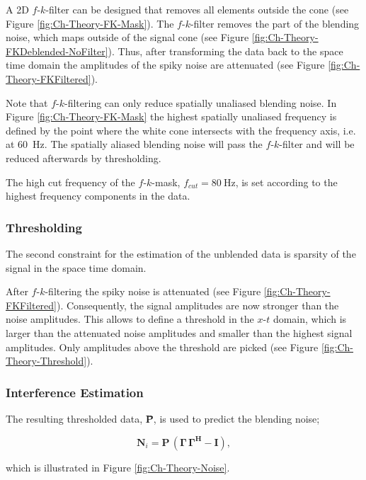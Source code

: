 A 2D $f$-$k$-filter can be designed that removes all elements outside the cone (see Figure \ref{fig:Ch-Theory-FK-Mask}). The $f$-$k$-filter removes the part of the blending noise, which maps outside of the signal cone (see Figure \ref{fig:Ch-Theory-FKDeblended-NoFilter}). Thus, after transforming the data back to the space time domain the amplitudes of the spiky noise are attenuated (see Figure \ref{fig:Ch-Theory-FKFiltered}). 

Note that $f$-$k$-filtering can only reduce spatially unaliased blending noise. In Figure \ref{fig:Ch-Theory-FK-Mask} the highest spatially unaliased frequency is defined by the point where the white cone intersects with the frequency axis, i.e. at \SI{60}{\hertz}. The spatially aliased blending noise will pass the $f$-$k$-filter and will be reduced afterwards by thresholding. 

The high cut frequency of the $f$-$k$-mask, $f_{cut} = \SI{80}{\hertz}$, is set according to the highest frequency components in the data. 

\subsubsection*{Thresholding}

The second constraint for the estimation of the unblended data is sparsity of the signal in the space time domain.

After $f$-$k$-filtering the spiky noise is attenuated (see Figure \ref{fig:Ch-Theory-FKFiltered}). Consequently, the signal amplitudes are now stronger than the noise amplitudes. This allows to define a threshold in the $x$-$t$ domain, which is larger than the attenuated noise amplitudes and smaller than the highest signal amplitudes. Only amplitudes above the threshold are picked (see Figure \ref{fig:Ch-Theory-Threshold}). 

\subsubsection*{Interference Estimation}

The resulting thresholded data, \textbf{\={P}}, is used to predict the blending noise;

\begin{equation}
	\textbf{\^{N}}_{i} = \textbf{\={P}} \, (\mathbf{\Gamma \, \Gamma^H} - \textbf{I}),
	\label{eq:Ch-Theory-NoiseEstimation}
\end{equation}

which is illustrated in Figure \ref{fig:Ch-Theory-Noise}.
 


